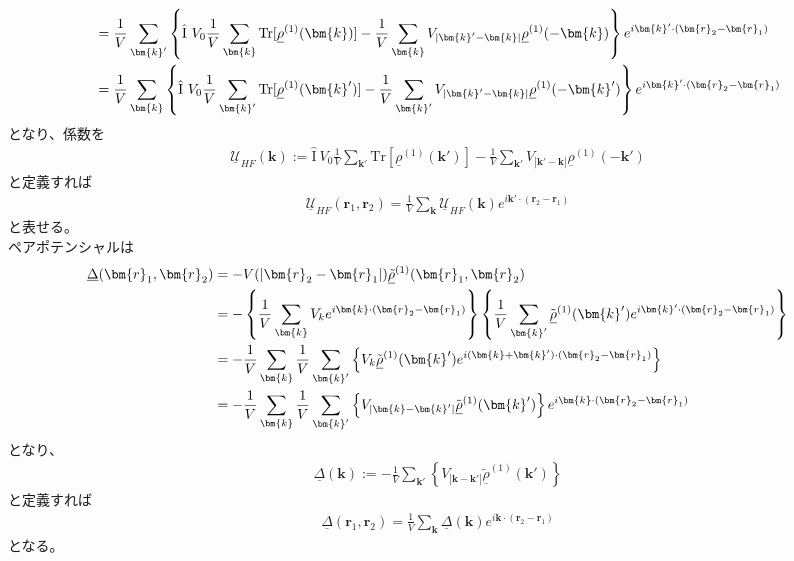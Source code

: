 \documentclass[dvipdfmx, 11pt, a4paper]{jsarticle}
\numberwithin{equation}{section}
\theoremstyle{definition}
\begin{document}
\begin{derivationBox}
\begin{align}
            &= \frac{1}{V}\sum_{\bm{k}'} \left\{ \hat{\mathrm{I}}\ V_{0}\frac{1}{V} \sum_{\bm{k}}     \mathrm{Tr}[ \underline{\rho}^{(1)}(\bm{k}) ]   -  \frac{1}{V} \sum_{\bm{k}} V_{|\bm{k}'-\bm{k}|}     \underline{\rho}^{(1)}(-\bm{k})\right\} e^{i\bm{k}'\cdot (\bm{r}_2 - \bm{r}_1)} \notag \\
            &= \frac{1}{V}\sum_{\bm{k}} \left\{ \hat{\mathrm{I}}\ V_{0}\frac{1}{V} \sum_{\bm{k}'}     \mathrm{Tr}[ \underline{\rho}^{(1)}(\bm{k}') ]   -  \frac{1}{V} \sum_{\bm{k}'} V_{|\bm{k}'-\bm{k}|}     \underline{\rho}^{(1)}(-\bm{k}')\right\} e^{i\bm{k}'\cdot (\bm{r}_2 - \bm{r}_1)}
        \end{align}
        となり、係数を
        \begin{align}
            \underline{\mathcal{U}}_{HF}(\bm{k}) := \hat{\mathrm{I}}\ V_{0}\frac{1}{V} \sum_{\bm{k}'}     \mathrm{Tr}[ \underline{\rho}^{(1)}(\bm{k}') ]   -  \frac{1}{V} \sum_{\bm{k}'} V_{|\bm{k}'-\bm{k}|}     \underline{\rho}^{(1)}(-\bm{k}')
        \end{align}
        と定義すれば
        \begin{align}
            \underline{\mathcal{U}}_{HF}(\bm{r}_1,\bm{r}_2)= \frac{1}{V}\sum_{\bm{k}} \underline{\mathcal{U}}_{HF}(\bm{k})e^{i\bm{k}'\cdot (\bm{r}_2 - \bm{r}_1)}
        \end{align}
        と表せる。\\
        ペアポテンシャルは
        \begin{align}
            \underline{\Delta}(\bm{r}_1,\bm{r}_2) &= -V(|\bm{r}_2-\bm{r}_1|)\underline{\tilde{\rho}}^{(1)}(\bm{r}_1,\bm{r}_2) \notag \\
            &= - \left\{ \frac{1}{V} \sum_{\bm{k}} V_k  e^{i\bm{k}\cdot (\bm{r}_2 - \bm{r}_1)}  \right\} \left\{ \frac{1}{V}\sum_{\bm{k}'} \tilde{\underline{\rho}}^{(1)}(\bm{k}') e^{i\bm{k}'\cdot(\bm{r}_2 - \bm{r}_1)} \right\} \notag \\
            &= -\frac{1}{V} \sum_{\bm{k}} \frac{1}{V}  \sum_{\bm{k}'} \left\{ V_k \tilde{\underline{\rho}}^{(1)}(\bm{k}') e^{i(\bm{k} +\bm{k}')\cdot(\bm{r}_2 - \bm{r}_1)} \right\} \notag \\
            &= -\frac{1}{V} \sum_{\bm{k}} \frac{1}{V}  \sum_{\bm{k}'} \left\{ V_{|\bm{k}-\bm{k}'|} \tilde{\underline{\rho}}^{(1)}(\bm{k}') \right\}e^{i\bm{k} \cdot(\bm{r}_2 - \bm{r}_1)} 
        \end{align}
        となり、
        \begin{align}
            \underline{\Delta}(\bm{k}) := -\frac{1}{V}  \sum_{\bm{k}'} \left\{ V_{|\bm{k}-\bm{k}'|} \tilde{\underline{\rho}}^{(1)}(\bm{k}') \right\}
        \end{align}
        と定義すれば
        \begin{align}
            \underline{\Delta}(\bm{r}_1,\bm{r}_2) = \frac{1}{V} \sum_{\bm{k}} \underline{\Delta}(\bm{k})e^{i\bm{k} \cdot(\bm{r}_2 - \bm{r}_1)} 
        \end{align}
        となる。
    \end{derivationBox}
\end{document}
